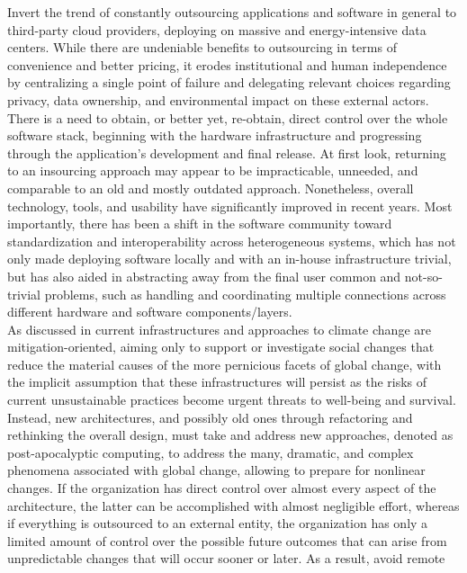 Invert the trend of constantly outsourcing applications and software in general to
third-party cloud providers, deploying on massive and energy-intensive data
centers. While there are undeniable benefits to outsourcing in terms of convenience
and better pricing, it erodes institutional and human independence by
centralizing a single point of failure and delegating relevant choices regarding
privacy, data ownership, and environmental impact on these external actors\cite{conceptualising_resource_aware}.
\\ %
There is a need to obtain, or better yet, re-obtain, direct control over the
whole software stack, beginning with the hardware infrastructure and progressing
through the application's development and final release. At first look, returning
to an insourcing approach may appear to be impracticable, unneeded, and comparable
to an old and mostly outdated approach. Nonetheless, overall technology, tools, and
usability have significantly improved in recent years. Most importantly, there has
been a shift in the software community toward standardization and interoperability
across heterogeneous systems, which has not only made deploying software locally
and with an in-house infrastructure trivial, but has also aided in abstracting away
from the final user common and not-so-trivial problems, such as handling and
coordinating multiple connections across different hardware and software
components/layers. \\ %
As discussed in \cite{precarious_infrastructure} current infrastructures and
approaches to climate change are mitigation-oriented, aiming only to support or investigate
social changes that reduce the material causes of the more pernicious facets of global
change, with the implicit assumption that these infrastructures will persist as
the risks of current unsustainable practices become urgent threats to well-being
and survival. Instead, new architectures, and possibly old ones through refactoring
and rethinking the overall design, must take and address new approaches, denoted
as post-apocalyptic computing, to address the many, dramatic, and complex
phenomena associated with global change, allowing to prepare for nonlinear changes.
If the organization has direct control over almost every aspect of the
architecture, the latter can be accomplished with almost negligible effort,
whereas if everything is outsourced to an external entity, the organization has only
a limited amount of control over the possible future outcomes that can arise from
unpredictable changes that will occur sooner or later. As a result, avoid remote
